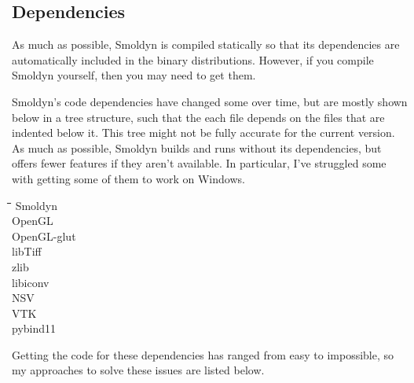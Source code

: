 \documentclass {scrbook}
\begin{document}
\subsection{Dependencies}

As much as possible, Smoldyn is compiled statically so that its dependencies are automatically included in the binary distributions. However, if you compile Smoldyn yourself, then you may need to get them.

Smoldyn's code dependencies have changed some over time, but are mostly shown below in a tree structure, such that the each file depends on the files that are indented below it. This tree might not be fully accurate for the current version. As much as possible, Smoldyn builds and runs without its dependencies, but offers fewer features if they aren't available. In particular, I've struggled some with getting some of them to work on Windows.

\begin{tabbing}
\hspace{0.25in}\=\hspace{0.25in}\=\hspace{0.25in}\=\hspace{0.25in}\=\hspace{0.25in}\=\kill
\>Smoldyn\\
\>\>OpenGL\\
\>\>OpenGL-glut\\
\>\>libTiff\\
\>\>zlib\\
\>\>libiconv\\
\>\>NSV\\
\>\>\>VTK\\
\>\>pybind11\\
\end{tabbing}

Getting the code for these dependencies has ranged from easy to impossible, so my approaches to solve these issues are listed below.
\end{document}
